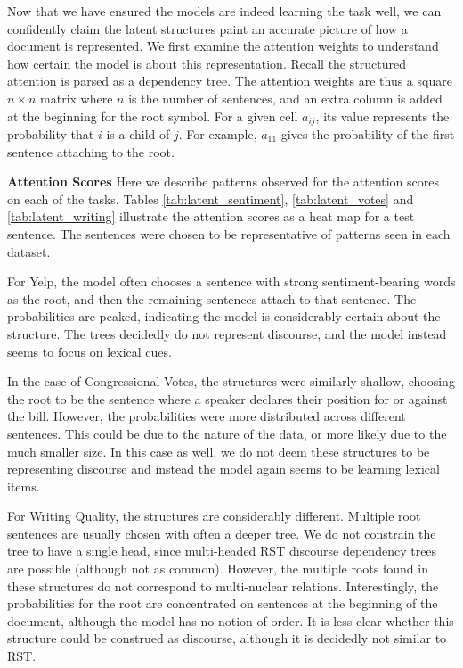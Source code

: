 Now that we have ensured the models are indeed learning the task well, we can confidently claim the latent structures paint an accurate picture of how a document is represented. We first examine the attention weights to understand how certain the model is about this representation. Recall the structured attention is parsed as a dependency tree. The attention weights are thus a square $n\times n$ matrix where $n$ is the number of sentences, and an extra column is added at the beginning for the root symbol. For a given cell $a_{ij}$, its value represents the probability that $i$ is a child of $j$. For example, $a_{11}$ gives the probability of the first sentence attaching to the root.

\smallskip
\noindent\textbf{Attention Scores} Here we describe patterns observed for the attention scores on each of the tasks. Tables \ref{tab:latent_sentiment}, \ref{tab:latent_votes} and \ref{tab:latent_writing} illustrate the attention scores as a heat map for a test sentence. The sentences were chosen to be representative of patterns seen in each dataset. 

For Yelp, the model often chooses a sentence with strong sentiment-bearing words as the root, and then the remaining sentences attach to that sentence. The probabilities are peaked, indicating the model is considerably certain about the structure. The trees decidedly do not represent discourse, and the model instead seems to focus on lexical cues.

In the case of Congressional Votes, the structures were similarly shallow, choosing the root to be the sentence where a speaker declares their position for or against the bill. However, the probabilities were more distributed across different sentences. This could be due to the nature of the data, or more likely due to the much smaller size. In this case as well, we do not deem these structures to be representing discourse and instead the model again seems to be learning lexical items.

For Writing Quality, the structures are considerably different. Multiple root sentences are usually chosen with often a deeper tree. We do not constrain the tree to have a single head, since multi-headed RST discourse dependency trees are possible (although not as common). However, the multiple roots found in these structures do not correspond to multi-nuclear relations. Interestingly, the probabilities for the root are concentrated on sentences at the beginning of the document, although the model has no notion of order. It is less clear whether this structure could be construed as discourse, although it is decidedly not similar to RST. 

